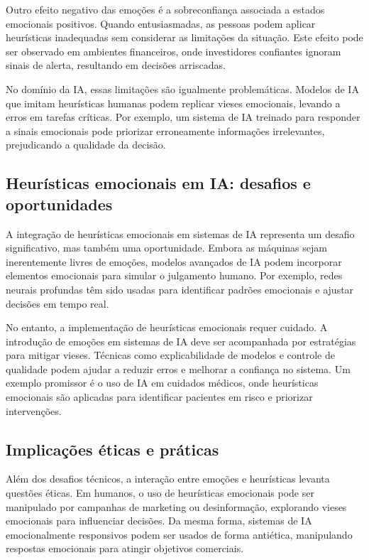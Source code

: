 \documentclass[a4paper,12pt]{report}
\begin{document}
	Outro efeito negativo das emoções é a sobreconfiança associada a estados emocionais positivos. Quando entusiasmadas, as pessoas podem aplicar heurísticas inadequadas sem considerar as limitações da situação. Este efeito pode ser observado em ambientes financeiros, onde investidores confiantes ignoram sinais de alerta, resultando em decisões arriscadas.
	
	No domínio da IA, essas limitações são igualmente problemáticas. Modelos de IA que imitam heurísticas humanas podem replicar vieses emocionais, levando a erros em tarefas críticas. Por exemplo, um sistema de IA treinado para responder a sinais emocionais pode priorizar erroneamente informações irrelevantes, prejudicando a qualidade da decisão.
	
	\subsection{Heurísticas emocionais em IA: desafios e oportunidades}
	
	A integração de heurísticas emocionais em sistemas de IA representa um desafio significativo, mas também uma oportunidade. Embora as máquinas sejam inerentemente livres de emoções, modelos avançados de IA podem incorporar elementos emocionais para simular o julgamento humano. Por exemplo, redes neurais profundas têm sido usadas para identificar padrões emocionais e ajustar decisões em tempo real.
	
	No entanto, a implementação de heurísticas emocionais requer cuidado. A introdução de emoções em sistemas de IA deve ser acompanhada por estratégias para mitigar vieses. Técnicas como explicabilidade de modelos e controle de qualidade podem ajudar a reduzir erros e melhorar a confiança no sistema. Um exemplo promissor é o uso de IA em cuidados médicos, onde heurísticas emocionais são aplicadas para identificar pacientes em risco e priorizar intervenções.
	
	\subsection{Implicações éticas e práticas}
	
	Além dos desafios técnicos, a interação entre emoções e heurísticas levanta questões éticas. Em humanos, o uso de heurísticas emocionais pode ser manipulado por campanhas de marketing ou desinformação, explorando vieses emocionais para influenciar decisões. Da mesma forma, sistemas de IA emocionalmente responsivos podem ser usados de forma antiética, manipulando respostas emocionais para atingir objetivos comerciais.
	
\end{document}
